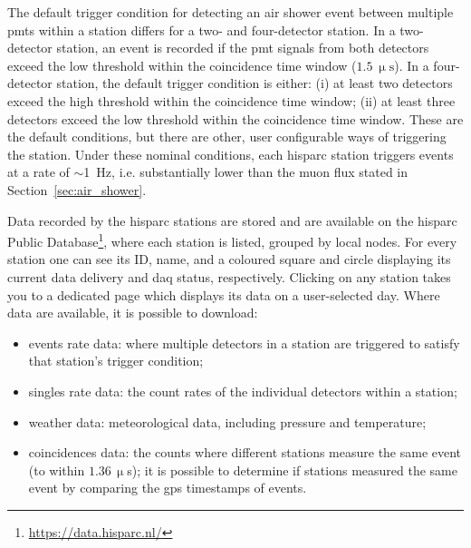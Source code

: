 The default trigger condition for detecting an air shower event between multiple \glspl{pmt} within a station differs for a two- and four-detector station. In a two-detector station, an event is recorded if the \gls{pmt} signals from both detectors exceed the low threshold within the coincidence time window ($1.5~\upmu\mathrm{s}$). In a four-detector station, the default trigger condition is either: (i) at least two detectors exceed the high threshold within the coincidence time window; (ii) at least three detectors exceed the low threshold within the coincidence time window. These are the default conditions, but there are other, user configurable ways of triggering the station. Under these nominal conditions, each \gls{hisparc} station triggers events at a rate of $\sim$1~Hz, i.e. substantially lower than the muon flux stated in Section~\ref{sec:air_shower}.




Data recorded by the \gls{hisparc} stations are stored and are available on the \gls{hisparc} Public Database\footnote{\url{https://data.hisparc.nl/}}, where each station is listed, grouped by local nodes. For every station one can see its ID, name, and a coloured square and circle displaying its current data delivery and \gls{daq} status, respectively. Clicking on any station takes you to a dedicated page which displays its data on a user-selected day. Where data are available, it is possible to download: %
%
\begin{itemize}
	\item{events rate data: where multiple detectors in a station are triggered to satisfy that station's trigger condition;}
	\item{singles rate data: the count rates of the individual detectors within a station;}
	\item{weather data: meteorological data, including pressure and temperature;}
	\item{coincidences data: the counts where different stations measure the same event (to within $1.36 \, \upmu$s); it is possible to determine if stations measured the same event by comparing the \gls{gps} timestamps of events.}
\end{itemize}

